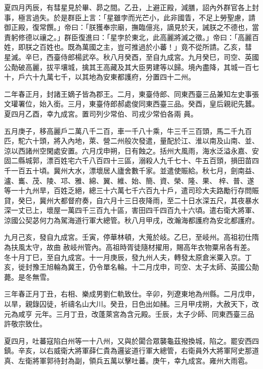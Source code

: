 \begin{pinyinscope}
 夏四月丙辰，有彗星見於畢、昴之間。乙丑，上避正殿，減膳，詔內外群官各上封事，極言過失。於是群臣上言：「星雖孛而光芒小，此非國眚，不足上勞聖慮，請御正殿，復常饌。」帝曰：「朕獲奉宗廟，撫臨億兆，謫見於天，誡朕之不德也，當責躬修德以禳之。」群臣復進曰：「星孛於東北，此高麗將滅之徵。」帝曰：「高麗百姓，即朕之百姓也。既為萬國之主，豈可推過於小蕃！」竟不從所請。乙亥，彗
 星滅。辛巳，西臺侍郎楊武卒。秋八月癸酉，至自九成宮。九月癸巳，司空、英國公勣破高麗，拔平壤城，擒其王高藏及其大臣男建等以歸。境內盡降，其城一百七十，戶六十九萬七千，以其地為安東都護府，分置四十二州。



 二年春正月，封諸王嫡子皆為郡王。二月，東臺侍郎、同東西臺三品兼知左史事張文瓘署位，始入銜。三月，東臺侍郎郝處俊同東西臺三品。癸酉，皇后親祀先蠶。夏四月乙酉，幸九成宮。置司列少常伯、司戎少常伯各兩
 員。



 五月庚子，移高麗戶二萬八千二百，車一千八十乘，牛三千三百頭，馬二千九百匹，駝六十頭，將入內地，萊、營二州般次發遣，量配於江、淮以南及山南、並、涼以西諸州空閑處安置。六月戊申朔，日有蝕之。括州大風雨，海水泛溢永嘉、安固二縣城郭，漂百姓宅六千八百四十三區，溺殺人九千七十、牛五百頭，損田苗四千一百五十頃。冀州大水，漂壞居人廬舍數千家。並遣使賑給。秋七月，劍南益、瀘、巂、茂、陵、邛、雅、綿、翼、維、始、簡、資、榮、隆、果、
 梓、普、遂等一十九州旱，百姓乏絕，總三十六萬七千六百九十戶，遣司珍大夫路勵行存問賑貸，癸巳，冀州大都督府奏，自六月十三日夜降雨，至二十日水深五尺，其夜暴水深一丈已上，壞屋一萬四千三百九十區，害田四千四百九十六頃。遣右衛大將軍、涼國公契苾何力為駕海道行軍大總管。秋八月甲戌，改瀚海都護府為安北都護府。



 九月己亥，發自九成宮。壬寅，停華林頓，大蒐於岐。乙巳，至岐州。高祖初仕隋為扶風太守，故曲
 赦岐州管內。高祖時胥徒隨材擢用，賜高年衣物粟帛各有差。冬十月丁巳，至自九成宮。十一月庚辰，發九州人夫，轉發太原倉米粟入京。丁亥，徙封豫王旭輪為冀王，仍令單名輪。十二月戊申，司空、太子太師、英國公勣薨。是冬無雪。



 三年春正月丁丑，右相、樂成男劉仁軌致仕。辛卯，列遼東地為州縣。二月戊申，以旱，親錄囚徒，祈禱名山大川。癸丑，日色出如赭。三月甲戌朔，大赦天下，改元為咸亨
 元年。三月丁丑，改蓬萊宮為含元殿。壬辰，太子少師、同東西臺三品許敬宗致仕。



 夏四月，吐蕃寇陷白州等一十八州，又與於闐合眾襲龜茲撥換城，陷之。罷安西四鎮。辛亥，以右威衛大將軍薛仁貴為邏娑道行軍大總管，右衛員外大將軍阿史那道真、左衛將軍郭待封為副，領兵五萬以擊吐蕃。庚午，幸九成宮。雍州大雨雹。




\end{pinyinscope}
